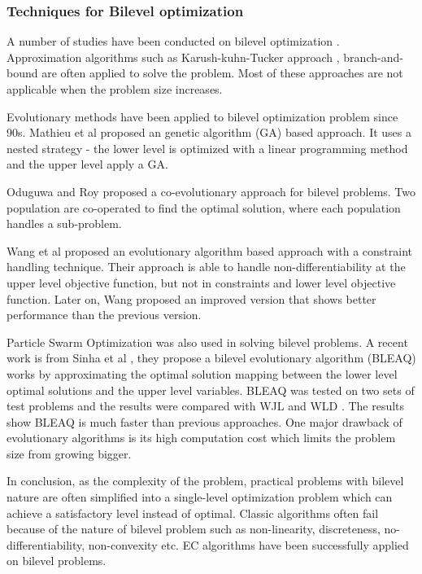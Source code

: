 \subsubsection{Techniques for Bilevel optimization}

A number of studies have been conducted on bilevel optimization \cite{Colson:2007bu,Dempe:2006jc}. Approximation algorithms such as Karush-kuhn-Tucker approach \cite{Bianco:2009ej, Herskovits:2000be}, branch-and-bound \cite{Bard:1982gs} are often applied to solve the problem. Most of these approaches are not applicable when the problem size increases.




Evolutionary methods have been applied to bilevel optimization problem since 90s. Mathieu et al \cite{Mathieu:1994uh} proposed an genetic algorithm (GA) based approach. It uses a nested strategy - the lower level is optimized with a linear programming method and the upper level apply a GA.

Oduguwa and Roy \cite{Oduguwa:2002kr} proposed a co-evolutionary approach for bilevel problems. Two population are co-operated to find the optimal solution, where each population handles a sub-problem. 

Wang et al \cite{Wang:2005fa} proposed an evolutionary algorithm based approach with a constraint handling technique.  Their approach is able to handle non-differentiability at the upper level objective function, but not in constraints and lower  level objective function.
Later on, Wang proposed an improved version \cite{Wang:2011di} that shows better performance than the previous version.

Particle Swarm Optimization \cite{Li:2006br} was also used in solving bilevel problems.
A recent work is from Sinha et al \cite{Sinha:2013tn}, they propose a bilevel evolutionary algorithm (BLEAQ) works by approximating the optimal solution mapping between the lower level optimal solutions and the upper level variables.  BLEAQ was tested on two sets of test problems and the results were compared with WJL \cite{Wang:2005fa} and WLD \cite{Wang:2011di}. The results show BLEAQ is much faster than previous approaches.
One major drawback of evolutionary algorithms is its high computation cost which limits the problem size from growing bigger.

In conclusion, as the complexity of the problem, practical problems with bilevel nature are often simplified into a single-level optimization problem which can achieve a satisfactory level instead of optimal. Classic algorithms often fail because of the nature of bilevel problem such as non-linearity, discreteness, no-differentiability, non-convexity etc. EC algorithms have been successfully applied on bilevel problems.

